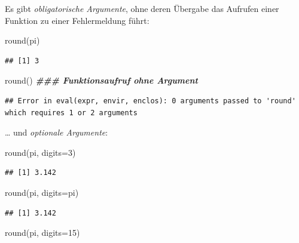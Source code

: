 \documentclass[
]{book}
\newenvironment{Shaded}{\begin{snugshade}}{\end{snugshade}}
\newcommand{\AttributeTok}[1]{\textcolor[rgb]{0.77,0.63,0.00}{#1}}
\newcommand{\DecValTok}[1]{\textcolor[rgb]{0.00,0.00,0.81}{#1}}
\newcommand{\DocumentationTok}[1]{\textcolor[rgb]{0.56,0.35,0.01}{\textbf{\textit{#1}}}}
\newcommand{\FunctionTok}[1]{\textcolor[rgb]{0.00,0.00,0.00}{#1}}
\newcommand{\NormalTok}[1]{#1}
\begin{document}
Es gibt \emph{obligatorische Argumente}, ohne deren Übergabe das Aufrufen einer Funktion zu einer Fehlermeldung führt:
\scriptsize

\begin{Shaded}
\begin{Highlighting}[]
\FunctionTok{round}\NormalTok{(pi)}
\end{Highlighting}
\end{Shaded}

\begin{verbatim}
## [1] 3
\end{verbatim}

\begin{Shaded}
\begin{Highlighting}[]
\FunctionTok{round}\NormalTok{() }\DocumentationTok{\#\#\# Funktionsaufruf ohne Argument}
\end{Highlighting}
\end{Shaded}

\begin{verbatim}
## Error in eval(expr, envir, enclos): 0 arguments passed to 'round' which requires 1 or 2 arguments
\end{verbatim}

\ldots{} und \emph{optionale Argumente}:
\scriptsize

\begin{Shaded}
\begin{Highlighting}[]
\FunctionTok{round}\NormalTok{(pi, }\AttributeTok{digits=}\DecValTok{3}\NormalTok{)}
\end{Highlighting}
\end{Shaded}

\begin{verbatim}
## [1] 3.142
\end{verbatim}

\begin{Shaded}
\begin{Highlighting}[]
\FunctionTok{round}\NormalTok{(pi, }\AttributeTok{digits=}\NormalTok{pi)}
\end{Highlighting}
\end{Shaded}

\begin{verbatim}
## [1] 3.142
\end{verbatim}

\begin{Shaded}
\begin{Highlighting}[]
\FunctionTok{round}\NormalTok{(pi, }\AttributeTok{digits=}\DecValTok{15}\NormalTok{)}
\end{Highlighting}
\end{Shaded}
\end{document}
